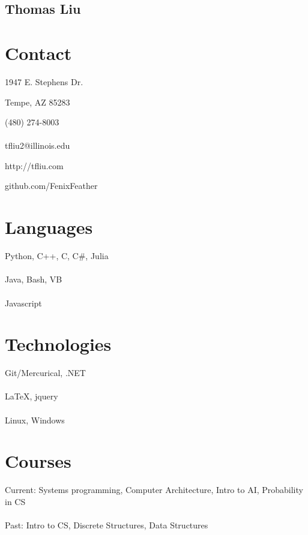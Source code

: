\documentclass[letterpaper,10pt]{article}
\begin{document}
\pagestyle{empty}
\begin{center}\section*{ \fontsize{48}{16}\selectfont Thomas Liu}\end{center}
\begin{minipage}[t][0em][t]{0.2\textwidth}
  \section*{\bf \huge Contact}
{\small 1947 E. Stephens Dr.

Tempe, AZ 85283

(480) 274-8003\\
~\\
tfliu2@illinois.edu

http://tfliu.com

github.com/FenixFeather
}
  \section*{\huge Languages}
  \begin{flushleft}{\small
      Python, C++, C, C\#, Julia\\
      ~\\
Java, Bash, VB\\
      ~\\
Javascript
    }\end{flushleft}

\section*{\huge Technologies}
  \begin{flushleft}{\small
      Git/Mercurical, .NET\\
      ~\\
LaTeX, jquery\\
      ~\\
Linux, Windows
    }\end{flushleft}

\section*{\huge Courses}
  \begin{flushleft}{\small
      Current: Systems programming, Computer Architecture, Intro to AI, Probability in CS\\
      ~\\
Past: Intro to CS, Discrete Structures, Data Structures
    }\end{flushleft}
\end{minipage}\hspace{0.5cm}
\end{document}
